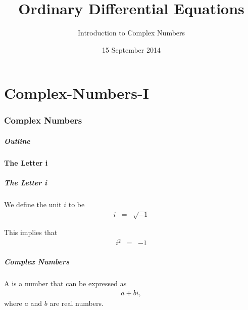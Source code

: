 \part{Complex-Numbers-I}
\section{Complex Numbers}

\title{Ordinary Differential Equations}
\subtitle{Introduction to Complex Numbers}
\date{15 September 2014}

\begin{frame}
  \titlepage
\end{frame}

\begin{frame}
  \frametitle{Outline}
  \tableofcontents[currentsection]
\end{frame}


\subsection{The Letter i}


\begin{frame}
  \frametitle{The Letter i}


  \begin{definition}
    We define the unit $i$ to be
    \begin{eqnarray*}
      i & = & \sqrt{-1}
    \end{eqnarray*}
  \end{definition}

  This implies that
  \begin{eqnarray*}
    i^2 & = & -1
  \end{eqnarray*}

\end{frame}


\begin{frame}
  \frametitle{Complex Numbers}

  \begin{definition}
    A  is a number that can be expressed as
    \begin{eqnarray*}
      a + bi,
    \end{eqnarray*}
    where $a$ and $b$ are real numbers.
  \end{definition}


\end{frame}



